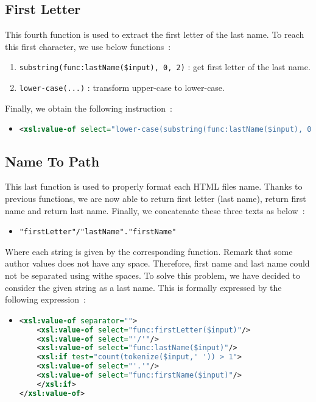\documentclass{article}
\begin{document}
  \subsection{First Letter}
    This fourth function is used to extract the first letter of the last name. To reach this first character, we use below functions~:
    \begin{enumerate}
      \item \verb|substring(func:lastName($input), 0, 2)| : get first letter of the last name.
      \item \verb|lower-case(...)| : transform upper-case to lower-case.
    \end{enumerate}
    Finally, we obtain the following instruction~:
    \begin{itemize}
      \item \begin{lstlisting}[language=XML]
<xsl:value-of select="lower-case(substring(func:lastName($input), 0, 2))" />\end{lstlisting}
    \end{itemize}

  \subsection{Name To Path} 
    This last function is used to properly format each HTML files name. Thanks to previous functions, we are now able to return first letter (last name), return first name and return last name. Finally, we concatenate these three texts as below~:
    \begin{itemize}
      \item \verb|"firstLetter"/"lastName"."firstName"|
    \end{itemize}
    Where each string is given by the corresponding function. Remark that some author values does not have any space. Therefore, first name and last name could not be separated using withe spaces. To solve this problem, we have decided to consider the given string as a last name. This is formally expressed by the following expression~:
   \begin{itemize}
    \item \begin{lstlisting}[language=XML]
<xsl:value-of separator="">
    <xsl:value-of select="func:firstLetter($input)"/>
    <xsl:value-of select="'/'"/>
    <xsl:value-of select="func:lastName($input)"/>
    <xsl:if test="count(tokenize($input,' ')) > 1">
	<xsl:value-of select="'.'"/>
	<xsl:value-of select="func:firstName($input)"/>
    </xsl:if>
</xsl:value-of>\end{lstlisting}
    \end{itemize}
\end{document}
